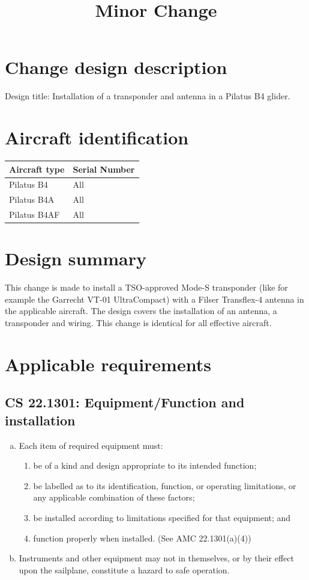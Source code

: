 \documentclass[twoside]{article}
\begin{document}
\title{Minor Change}
\author{}
\date{}
\maketitle

\section{Change design description}
Design title: Installation of a transponder and antenna in a Pilatus B4 glider.

\section{Aircraft identification}
\begin{tabular}{|l|l|}
\hline
Aircraft type & Serial Number \\
\hline
Pilatus B4 & All \\
Pilatus B4A & All \\
Pilatus B4AF & All \\
\hline
\end{tabular}

\section{Design summary}
This change is made to install a TSO-approved Mode-S transponder (like for example the Garrecht VT-01 UltraCompact) with a Filser Transflex-4 antenna in the applicable aircraft. The design covers the installation of an antenna, a transponder and wiring. This change is identical for all effective aircraft.

\section{Applicable requirements}
\subsection[CS 22.1301]{CS 22.1301:  Equipment/Function and installation}
\begin{enumerate}[(a)]
\item Each item of required equipment must:
	\begin{enumerate}[(1)]
          \item be of a kind and design appropriate to its intended function;
          \item be labelled as to its identification, function, or operating limitations, or any applicable combination of these factors;
          \item be installed according to limitations specified for that equipment; and
          \item function properly when installed. (See AMC 22.1301(a)(4))
	\end{enumerate}
\item Instruments and other equipment may not in themselves, or by their effect upon the sailplane, constitute a hazard to safe operation.
\end{enumerate}
\end{document}
